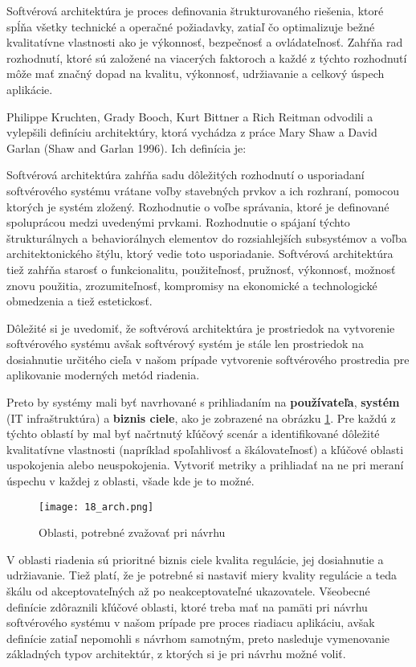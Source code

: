 \indent Softvérová architektúra je proces definovania štrukturovaného riešenia, ktoré spĺňa všetky technické a operačné požiadavky, zatiaľ čo optimalizuje bežné kvalitatívne vlastnosti ako je výkonnosť, bezpečnosť a ovládateľnosť. Zahŕňa rad rozhodnutí, ktoré sú založené na viacerých faktoroch a každé z týchto rozhodnutí môže mať značný dopad na kvalitu, výkonnosť, udržiavanie a celkový úspech aplikácie.

\indent Philippe Kruchten, Grady Booch, Kurt Bittner a Rich Reitman odvodili a vylepšili definíciu architektúry, ktorá vychádza z práce Mary Shaw a David Garlan (Shaw and Garlan 1996). Ich definícia je:

\indent Softvérová architektúra zahŕňa sadu dôležitých rozhodnutí o usporiadaní softvérového systému vrátane voľby stavebných prvkov a ich rozhraní, pomocou ktorých je systém zložený. Rozhodnutie o voľbe správania, ktoré je definované spoluprácou medzi uvedenými prvkami. Rozhodnutie o spájaní týchto štrukturálnych a behaviorálnych elementov do rozsiahlejších subsystémov a voľba architektonického štýlu, ktorý vedie toto usporiadanie. Softvérová architektúra tiež zahŕňa starosť o funkcionalitu, použiteľnosť, pružnosť, výkonnosť, možnosť znovu použitia, zrozumiteľnosť, kompromisy na ekonomické a technologické obmedzenia a tiež estetickosť. \cite{IOT02}

\indent Dôležité si je uvedomiť, že softvérová architektúra je prostriedok na vytvorenie softvérového systému avšak softvérový systém je stále len prostriedok na dosiahnutie určitého cieľa v našom prípade vytvorenie softvérového prostredia pre aplikovanie moderných metód riadenia.

\indent Preto by systémy mali byť navrhované s prihliadaním na \textbf{používateľa}, \textbf{systém} (IT infraštruktúra) a \textbf{biznis ciele}, ako je zobrazené na obrázku \ref{18_arch}. Pre každú z týchto oblastí by mal byť načrtnutý kľúčový scenár a identifikované dôležité kvalitatívne vlastnosti (napríklad spoľahlivosť a škálovateľnosť) a kľúčové oblasti uspokojenia alebo neuspokojenia. Vytvoriť metriky a prihliadať na ne pri meraní úspechu v každej z oblasti, všade kde je to možné.\cite{IOT02}
\begin{figure}[!htbp]
\centering
\texttt{[image: 18\_arch.png]}
\caption{Oblasti, potrebné zvažovať pri návrhu\cite{IOT02}}
\label{18_arch}
\end{figure}
V oblasti riadenia sú prioritné biznis ciele kvalita regulácie, jej dosiahnutie  a udržiavanie. Tiež platí, že je potrebné si nastaviť miery kvality regulácie a teda škálu od akceptovateľných až po neakceptovateľné ukazovatele. Všeobecné definície zdôraznili kľúčové oblasti, ktoré treba mať na pamäti pri návrhu softvérového systému v našom prípade pre proces riadiacu aplikáciu, avšak definície zatiaľ nepomohli s návrhom samotným, preto nasleduje vymenovanie základných typov architektúr, z ktorých si je pri návrhu možné voliť.

